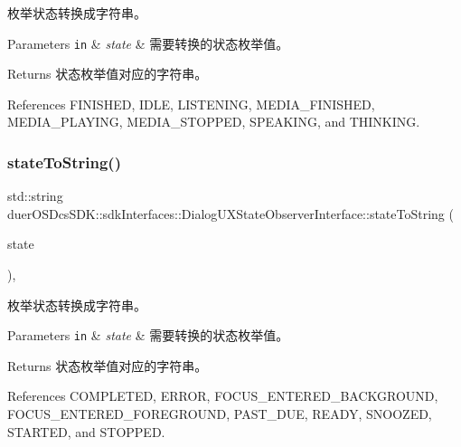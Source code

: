 枚举状态转换成字符串。 


\begin{DoxyParams}[1]{Parameters}
\mbox{\tt in}  & {\em state} & 需要转换的状态枚举值。 \\
\hline
\end{DoxyParams}
\begin{DoxyReturn}{Returns}
状态枚举值对应的字符串。 
\end{DoxyReturn}


References F\+I\+N\+I\+S\+H\+ED, I\+D\+LE, L\+I\+S\+T\+E\+N\+I\+NG, M\+E\+D\+I\+A\+\_\+\+F\+I\+N\+I\+S\+H\+ED, M\+E\+D\+I\+A\+\_\+\+P\+L\+A\+Y\+I\+NG, M\+E\+D\+I\+A\+\_\+\+S\+T\+O\+P\+P\+ED, S\+P\+E\+A\+K\+I\+NG, and T\+H\+I\+N\+K\+I\+NG.

\mbox{\label{classduerOSDcsSDK_1_1sdkInterfaces_1_1DialogUXStateObserverInterface_aa80a09873abe1e5f805594deb2a38afa}} 
\subsubsection{\texorpdfstring{state\+To\+String()}{stateToString()}\hspace{0.1cm}{\footnotesize\ttfamily [2/2]}}
{\footnotesize\ttfamily std\+::string duer\+O\+S\+Dcs\+S\+D\+K\+::sdk\+Interfaces\+::\+Dialog\+U\+X\+State\+Observer\+Interface\+::state\+To\+String (\begin{DoxyParamCaption}\item[{\hyperlink{classduerOSDcsSDK_1_1sdkInterfaces_1_1DialogUXStateObserverInterface_ac45d1c6a17f061837ace6a4aeff9cc46}{Alert\+State}}]{state }\end{DoxyParamCaption})\hspace{0.3cm}{\ttfamily [inline]}, {\ttfamily [static]}}



枚举状态转换成字符串。 


\begin{DoxyParams}[1]{Parameters}
\mbox{\tt in}  & {\em state} & 需要转换的状态枚举值。 \\
\hline
\end{DoxyParams}
\begin{DoxyReturn}{Returns}
状态枚举值对应的字符串。 
\end{DoxyReturn}


References C\+O\+M\+P\+L\+E\+T\+ED, E\+R\+R\+OR, F\+O\+C\+U\+S\+\_\+\+E\+N\+T\+E\+R\+E\+D\+\_\+\+B\+A\+C\+K\+G\+R\+O\+U\+ND, F\+O\+C\+U\+S\+\_\+\+E\+N\+T\+E\+R\+E\+D\+\_\+\+F\+O\+R\+E\+G\+R\+O\+U\+ND, P\+A\+S\+T\+\_\+\+D\+UE, R\+E\+A\+DY, S\+N\+O\+O\+Z\+ED, S\+T\+A\+R\+T\+ED, and S\+T\+O\+P\+P\+ED.

